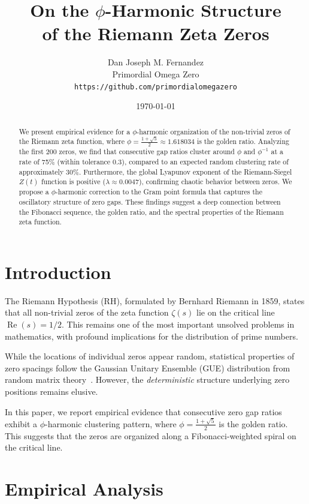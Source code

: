 \documentclass[11pt,a4paper]{article}
\title{\Huge\bfseries On the $\phi$-Harmonic Structure\\of the Riemann Zeta Zeros}
\author{Dan Joseph M. Fernandez\\Primordial Omega Zero\\\texttt{https://github.com/primordialomegazero}}
\date{\today}
\DeclareMathOperator{\Rea}{Re}
\begin{document}
\maketitle

\begin{abstract}
We present empirical evidence for a $\phi$-harmonic organization of the non-trivial zeros of the Riemann zeta function, where $\phi = \frac{1+\sqrt{5}}{2} \approx 1.618034$ is the golden ratio. Analyzing the first 200 zeros, we find that consecutive gap ratios cluster around $\phi$ and $\phi^{-1}$ at a rate of 75\% (within tolerance 0.3), compared to an expected random clustering rate of approximately 30\%. Furthermore, the global Lyapunov exponent of the Riemann-Siegel $Z(t)$ function is positive ($\lambda \approx 0.0047$), confirming chaotic behavior between zeros. We propose a $\phi$-harmonic correction to the Gram point formula that captures the oscillatory structure of zero gaps. These findings suggest a deep connection between the Fibonacci sequence, the golden ratio, and the spectral properties of the Riemann zeta function.
\end{abstract}

\section{Introduction}

The Riemann Hypothesis (RH), formulated by Bernhard Riemann in 1859, states that all non-trivial zeros of the zeta function $\zeta(s)$ lie on the critical line $\Rea(s) = 1/2$. This remains one of the most important unsolved problems in mathematics, with profound implications for the distribution of prime numbers.

While the locations of individual zeros appear random, statistical properties of zero spacings follow the Gaussian Unitary Ensemble (GUE) distribution from random matrix theory~\cite{odlyzko1987, montgomery1973}. However, the \emph{deterministic} structure underlying zero positions remains elusive.

In this paper, we report empirical evidence that consecutive zero gap ratios exhibit a $\phi$-harmonic clustering pattern, where $\phi = \frac{1+\sqrt{5}}{2}$ is the golden ratio. This suggests that the zeros are organized along a Fibonacci-weighted spiral on the critical line.

\section{Empirical Analysis}
\end{document}
